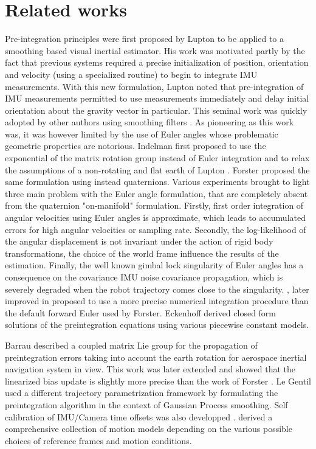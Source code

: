 \section{Related works}


Pre-integration principles were first proposed by Lupton \cite{lupton-09} to be applied to a smoothing based visual inertial estimator. His work was motivated partly 
by the fact that previous systems required a precise initialization of position, orientation and velocity (using a specialized routine) to begin to integrate IMU measurements. 
With this new formulation, Lupton noted that pre-integration of IMU measurements permitted to use measurements immediately and delay initial orientation about the gravity
vector in particular. 
This seminal work was quickly adopted by other authors using smoothing filters \cite{carlone2014eliminating}. As pioneering as this work was, it was however 
limited by the use of Euler angles whose problematic geometric properties are notorious. Indelman \cite{Indelman-2013-7768} first proposed to use the exponential of the 
matrix rotation group instead of Euler integration and to relax the assumptions of a non-rotating and flat earth of Lupton \cite{lupton-09}. Forster \cite{forster2015imu, forster2017-TRO}
proposed the same formulation using instead quaternions. Various experiments brought to light three main problem with the Euler angle formulation, that are completely absent 
from the quaternion "on-manifold" formulation. Firstly, first order integration of angular velocities using Euler angles is approximate, which leads to accumulated errors 
for high angular velocities or sampling rate.  Secondly, the log-likelihood of the angular displacement is not invariant under the action of rigid body transformations, 
\eg the choice of the world frame influence the results of the estimation. Finally, the well known gimbal lock singularity of Euler angles has a consequence 
on the covariance IMU noise covariance propagation, which is severely degraded when the robot trajectory comes close to the singularity. 
\cite{shen2015tightly}, later improved in \cite{qin2018vins} proposed to use a more precise numerical integration procedure than the default forward Euler used by Forster. 
Eckenhoff \cite{eckenhoff2019closed} derived closed form solutions of the preintegration equations using various piecewise constant models.

Barrau \cite{barrau2020mathematical} described a coupled matrix Lie group for the propagation of preintegration errors taking into account the earth rotation for aerospace
inertial navigation system in view. This work was later extended \cite{brossard2021associating} and showed that the linearized bias update is slightly more precise than 
the work of Forster \cite{forster2017-TRO}. Le Gentil \cite{le2020gaussian} used a different trajectory parametrization framework by formulating the preintegration algorithm 
in the context of Gaussian Process smoothing. Self calibration of IMU/Camera time offsets was also developped \cite{yang2020analytic}. 
\cite{luo2021unified} derived a comprehensive collection of motion models depending on the various possible choices of reference frames and motion conditions. 

